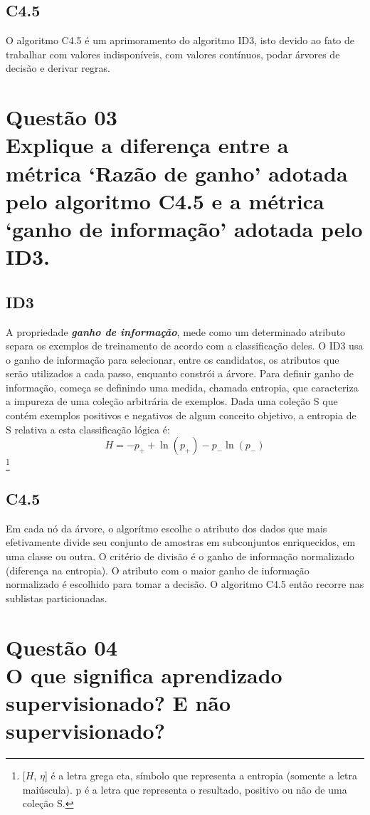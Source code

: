 \documentclass[12pt]{article}
\begin{document}
\subsection{C4.5}
O algoritmo C4.5 é um aprimoramento do algoritmo ID3, isto devido ao fato de trabalhar com valores indisponíveis, com valores contínuos, podar árvores de decisão e derivar regras.

\section{Questão 03\\
Explique a diferença entre a métrica ‘Razão de ganho’ adotada pelo algoritmo C4.5 e a métrica ‘ganho de informação’ adotada pelo ID3.
}
\subsection{ID3}
A propriedade \textbf{\textit{ganho de informação}}, mede como um determinado atributo separa os exemplos de treinamento de acordo com a classificação deles.
O ID3 usa o ganho de informação para selecionar, entre os candidatos, os atributos que serão utilizados a cada passo, enquanto constrói a árvore.
Para definir ganho de informação, começa se definindo uma medida, chamada entropia, que caracteriza a impureza de uma coleção arbitrária de exemplos.
Dada uma coleção S que contém exemplos positivos e negativos de algum conceito objetivo, a entropia de S relativa a esta classificação lógica é:
\begin{equation}
    H = -p_+ + \ln(p_+) -p_- \ln(p_-)
\end{equation}\footnote{
    [$H$, $\eta$] é a letra grega eta, símbolo que representa a entropia (somente a letra maiúscula).
    p é a letra que representa o resultado, positivo ou não de uma coleção S.
}


\subsection{C4.5}
Em cada nó da árvore, o algorítmo escolhe o atributo dos dados que mais efetivamente divide seu conjunto de amostras em subconjuntos enriquecidos, em uma classe ou outra.
O critério de divisão é o ganho de informação normalizado (diferença na entropia).
O atributo com o maior ganho de informação normalizado é escolhido para tomar a decisão.
O algoritmo C4.5 então recorre nas sublistas particionadas.

\section{Questão 04\\
O que significa aprendizado supervisionado? E não supervisionado?
}
\end{document}
